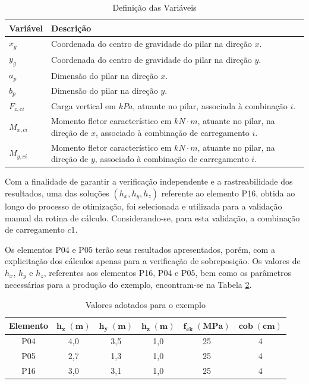 \begin{table}[htpb!]
    \centering
    \caption{Definição das Variáveis}
    \label{tab:variaveis_descricao}
    \begin{tabular}{lp{10cm}} %
        \toprule
        \textbf{Variável} & \textbf{Descrição} \\
        \midrule
         $x_g$ & Coordenada do centro de gravidade do pilar na direção $x$. \\
         $y_g$ & Coordenada do centro de gravidade do pilar na direção $y$. \\ 
         $a_p$ & Dimensão do pilar na direção $x$. \\
         $b_p$ & Dimensão do pilar na direção $y$. \\
         $F_{z,ci}$ & Carga vertical em $kPa$, atuante no pilar, associada à combinação $i$.\\
         $M_{x,ci}$ & Momento fletor característico em $kN \cdot m$, atuante no pilar, na direção de $x$, associado à combinação de carregamento $i$.\\
         $M_{y,ci}$ & Momento fletor característico em $kN \cdot m$, atuante no pilar, na direção de $y$, associado à combinação de carregamento $i$.\\
        \bottomrule
    \end{tabular}
\end{table}

Com a finalidade de garantir a verificação independente e a rastreabilidade dos resultados, uma das soluções $(h_x, h_y, h_z)$ referente ao elemento P16, obtida ao longo do processo de otimização, foi selecionada e utilizada para a validação manual da rotina de cálculo. Considerando-se, para esta validação, a combinação de carregamento $c1$.  

Os elementos P04 e P05 terão seus resultados apresentados, porém, com a explicitação dos cálculos apenas para a verificação de sobreposição. Os valores de $h_x$, $h_y$ e $h_z$, referentes aos elementos P16, P04 e P05, bem como os parâmetros necessárias para a produção do exemplo, encontram-se na Tabela \ref{tab:valores_adotados}.

\begin{table}[htpb!]
\centering
\caption{Valores adotados para o exemplo}
\label{tab:valores_adotados}
\setlength{\tabcolsep}{10pt}
\begin{tabular}{c c c c c c}
\toprule
   \textbf{Elemento} & $\mathbf{h_x \; (m)}$ & $\mathbf{h_y \; (m)}$ & $\mathbf{h_z \; (m)}$ & $\mathbf{f_{ck} \; (MPa)}$ & $\mathbf{cob \;(cm)}$  \\
\midrule
P04 & 4,0 & 3,5 & 1,0 & 25 & 4 \\
P05 & 2,7 & 1,3 & 1,0 & 25 & 4 \\
P16 & 3,0 & 3,1 & 1,0 & 25 & 4 \\
\bottomrule
\end{tabular}
\end{table}


